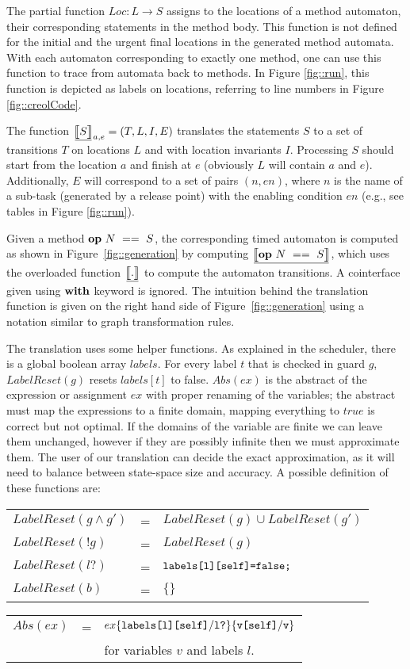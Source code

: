 \documentclass[copyright,creativecommons]{eptcs}
\theoremstyle{definition}
\newcommand{\trule}[1]{\big[\hspace{-.1cm}\underline{\big[#1\big]}\hspace{-.1cm}\big]}
\begin{document}
The partial function $Loc: L \rightarrow S$ assigns to the locations of a method automaton, their corresponding statements in the method body. This function is not defined for the  initial and the urgent final locations in the generated method automata. With each automaton corresponding to exactly one method, one can use this function to trace from automata back to methods.
In Figure \ref{fig::run}, this function is depicted as labels on locations, referring to line numbers in Figure \ref{fig::creolCode}.

The function $\trule{S}_{a,e} = (T, L, I, E)$ translates the statements $S$ to a set of transitions $T$ on locations $L$ and with location invariants $I$.  Processing $S$ should start from the location $a$ and finish at $e$ (obviously $L$ will contain $a$ and $e$).
Additionally, $E$ will correspond to a set of pairs $(n, en)$, where $n$ is the name of a sub-task (generated by a release point) with the enabling condition $en$ (e.g., see tables in Figure \ref{fig::run}).


Given a method ${\bf op} ~N~ ==~ S$, the corresponding timed automaton is computed as shown in Figure~\ref{fig::generation} by computing $\trule{{\bf op} ~N~ ==~ S}$, which uses the overloaded function $\trule{.}$ to compute the automaton transitions.
A cointerface given using ${\bf with}$ keyword is ignored.
The intuition behind the translation function is given on the right hand side of Figure~\ref{fig::generation} using a notation similar to graph transformation rules.


The translation uses some helper functions.
As explained in the scheduler, there is a global boolean array $labels$.
For every label $t$ that is checked in guard $g$, $LabelReset(g)$ resets $labels[t]$ to false.
$Abs(ex)$ is the abstract of the expression or assignment $ex$ with proper renaming of the variables; the abstract must map the expressions to a finite domain, mapping everything to $true$ is correct but not optimal.
If the domains of the variable are finite we can leave them unchanged, however if they are possibly infinite then we must approximate them.  The user of our translation can decide the exact approximation, as it will need to balance between state-space size and accuracy. A possible definition of these functions are:

{\footnotesize
\begin{tabular}{@{}l@{~~}l@{~~}l}
\\[-6pt]
$LabelReset(g \land g')$& = &$LabelReset(g) \cup LabelReset(g')$\\
$LabelReset(!g) $& = &$ LabelReset(g)$ \\
$LabelReset(l?) $& = &$ \verb+labels[l][self]=false;+$ \\
$LabelReset(b) $& = &$ \{\}$\\[6pt]
\end{tabular}
\begin{tabular}{l@{~~}l@{~~}l}
$Abs(ex) $&=&$ ex \{ \verb+labels[l][self]+ /  \verb+l?+ \} \{ \verb+v[self]+ /  \verb+v+ \}$ \\
&&for variables $v$ and labels $l$.
\end{tabular}
}
\end{document}
